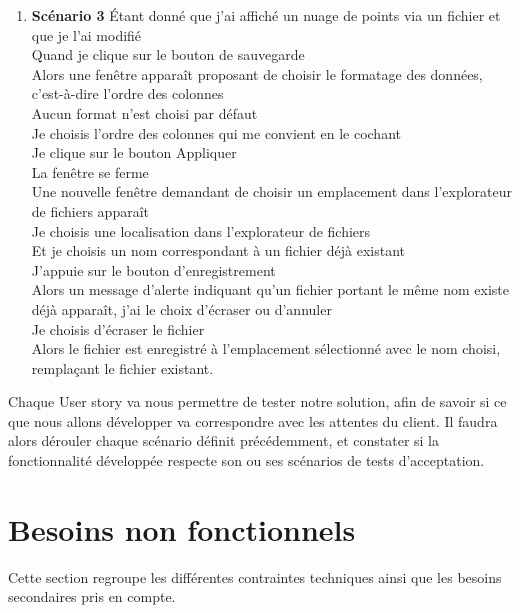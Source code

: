 \documentclass[12pt,titlepage,french]{article}
\begin{document}
\begin{enumerate}
\begin{enumerate}
    \item \textbf{Scénario 3}
Étant donné que j'ai affiché un nuage de points via un fichier et que je l'ai modifié\\
Quand je clique sur le bouton de sauvegarde\\
Alors une fenêtre apparaît proposant de choisir le formatage des données, c'est-à-dire l'ordre des colonnes\\
Aucun format n'est choisi par défaut\\
Je choisis l'ordre des colonnes qui me convient en le cochant\\
Je clique sur le bouton Appliquer\\
La fenêtre se ferme\\
Une nouvelle fenêtre demandant de choisir un emplacement dans l'explorateur de fichiers apparaît\\
Je choisis une localisation dans l'explorateur de fichiers\\
Et je choisis un nom correspondant à un fichier déjà existant\\
J'appuie sur le bouton d'enregistrement\\
Alors un message d'alerte indiquant qu'un fichier portant le même nom existe déjà apparaît, j'ai le choix d'écraser ou d'annuler\\
Je choisis d'écraser le fichier\\
Alors le fichier est enregistré à l'emplacement sélectionné avec le nom choisi, remplaçant le fichier existant.

\end{enumerate}
\end{enumerate}

Chaque User story va nous permettre de tester notre solution, afin de savoir si ce que nous allons développer va correspondre avec les attentes du client. Il faudra alors dérouler chaque scénario définit précédemment, et constater si la fonctionnalité développée respecte son ou ses scénarios de tests d'acceptation.

\section{Besoins non fonctionnels}

Cette section regroupe les différentes contraintes techniques ainsi que les besoins secondaires pris en compte.\\
\end{document}
